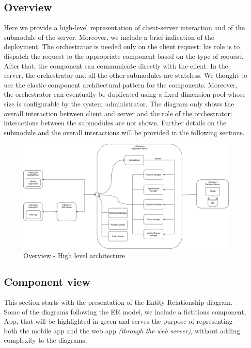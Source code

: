 \subsection{Overview}
	Here we provide a high-level representation of client-server interaction and of the submodule of the server. Moreover, we include a brief indication of the deployment.\newline
	The orchestrator is needed only on the client request: his role is to dispatch the request to the appropriate component based on the type of request. After that, the component can communicate directly with the client.\newline
	In the server, the orchestrator and all the other submodules are stateless. We thought to use the elastic component architectural pattern for the components. Moreover, the orchestrator can eventually be duplicated using a fixed dimension pool whose size is configurable by the system administrator.\newline
	The diagram only shows the overall interaction between client and server and the role of the orchestrator: interactions between the submodules are not shown. Further details on the submodule and the overall interactions will be provided in the following sections.

	\begin{figure}[H]
		\centerline{\includegraphics[width=0.9\paperwidth]{Images/Overview}}
		\caption{Overview - High level architecture}
	\end{figure}

\filbreak
\subsection{Component view}
	This section starts with the presentation of the Entity-Relationship diagram. Some of the diagrams following the ER model, we include a fictitious component, App, that will be highlighted in green and serves the purpose of representing both the mobile app and the web app \textit{(through the web server)}, without adding complexity to the diagrams.
